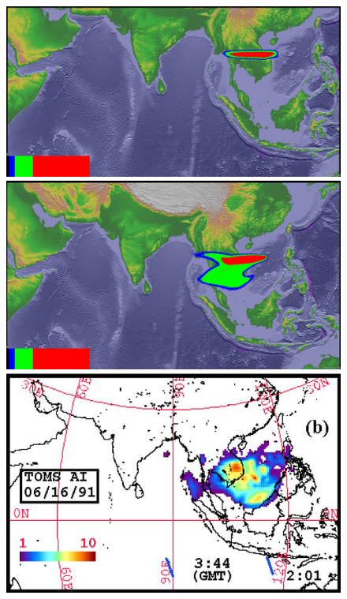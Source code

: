 \begin{figure}[!htb]
    \centering
    \begin{minipage}{.325\textwidth}
        \centering
        \includegraphics[width=0.99 \textwidth]{Chapter-7/Figures/bent-23hr-ash}
    \end{minipage}%
    \begin{minipage}{.325 \textwidth}
        \centering
        \includegraphics[width=0.99 \textwidth]{Chapter-7/Figures/SPH-Plume-23hr-ash}
    \end{minipage}%
    \begin{minipage}{.325 \textwidth}
        \centering
        \includegraphics[width=0.99 \textwidth]{Chapter-7/Figures/OB-ash-23hr-ash}

\end{minipage}
\end{figure}
